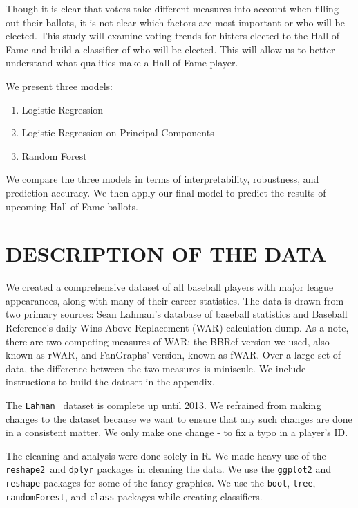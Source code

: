 \documentclass[letterpaper, 10 pt, conference]{ieeeconf}
\begin{document}
Though it is clear that voters take different measures into account when filling out their ballots, it is not clear which factors are most important or who will be elected. This study will examine voting trends for hitters elected to the Hall of Fame and build a classifier of who will be elected. This will allow us to better understand what qualities make a Hall of Fame player.

We present three models:
\begin{enumerate}
\item Logistic Regression
\item Logistic Regression on Principal Components
\item Random Forest
\end{enumerate}

We compare the three models in terms of interpretability, robustness, and prediction accuracy. We then apply our final model to predict the results of upcoming Hall of Fame ballots.

\section{DESCRIPTION OF THE DATA}
We created a comprehensive dataset of all baseball players with major league appearances, along with many of their career statistics. The data is drawn from two primary sources: Sean Lahman's database of baseball statistics and Baseball Reference’s daily Wins Above Replacement (WAR) calculation dump. As a note, there are two competing measures of WAR: the BBRef version we used, also known as rWAR, and FanGraphs’ version, known as fWAR. Over a large set of data, the difference between the two measures is miniscule. We include instructions to build the dataset in the appendix.

The {{\tt\small Lahman }} dataset is complete up until 2013. We refrained from making changes to the dataset because we want to ensure that any such changes are done in a consistent matter. We only make one change - to fix a typo in a player's ID.

The cleaning and analysis were done solely in R. We made heavy use of the {{\tt\small reshape2 }}and {{\tt\small dplyr}} packages in cleaning the data. We use the {{\tt\small ggplot2}} and {{\tt\small reshape}} packages for some of the fancy graphics. We use the {{\tt\small boot}}, {{\tt\small tree}}, {{\tt\small randomForest}}, and {{\tt\small class}} packages while creating classifiers. 
\end{document}
